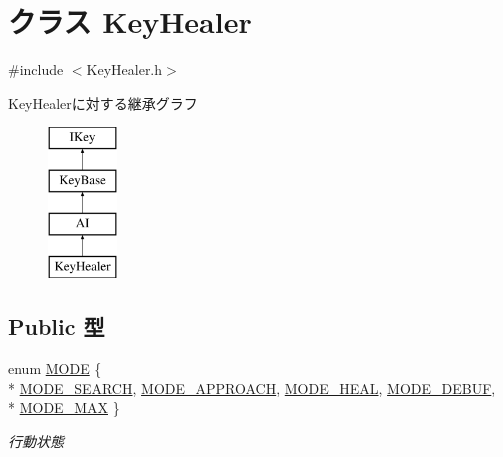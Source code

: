 \hypertarget{class_key_healer}{\section{クラス Key\-Healer}
\label{class_key_healer}
}


{\ttfamily \#include $<$Key\-Healer.\-h$>$}

Key\-Healerに対する継承グラフ\begin{figure}[H]
\begin{center}
\leavevmode
\includegraphics[height=4.000000cm]{d6/def/class_key_healer}
\end{center}
\end{figure}
\subsection*{Public 型}
{\bf }\par
\begin{DoxyCompactItemize}
\item 
enum \hyperlink{class_key_healer_aefc9d3de1d5f7121b3584255e580c5f0}{M\-O\-D\-E} \{ \\*
\hyperlink{class_key_healer_aefc9d3de1d5f7121b3584255e580c5f0a836e15803ee0af6791c07ddb8c5b7e80}{M\-O\-D\-E\-\_\-\-S\-E\-A\-R\-C\-H}, 
\hyperlink{class_key_healer_aefc9d3de1d5f7121b3584255e580c5f0a1927bb6a17416f47b286fb6c942727e9}{M\-O\-D\-E\-\_\-\-A\-P\-P\-R\-O\-A\-C\-H}, 
\hyperlink{class_key_healer_aefc9d3de1d5f7121b3584255e580c5f0ae9c2b238756ce70f4a844b692d8d72e4}{M\-O\-D\-E\-\_\-\-H\-E\-A\-L}, 
\hyperlink{class_key_healer_aefc9d3de1d5f7121b3584255e580c5f0a7e1bb63e07904c68a514b68f4cd86520}{M\-O\-D\-E\-\_\-\-D\-E\-B\-U\-F}, 
\\*
\hyperlink{class_key_healer_aefc9d3de1d5f7121b3584255e580c5f0a0cbc15d72278acde3e526496fee60c9f}{M\-O\-D\-E\-\_\-\-M\-A\-X}
 \}
\begin{DoxyCompactList}\small\item\em 行動状態 \end{DoxyCompactList}\end{DoxyCompactItemize}


